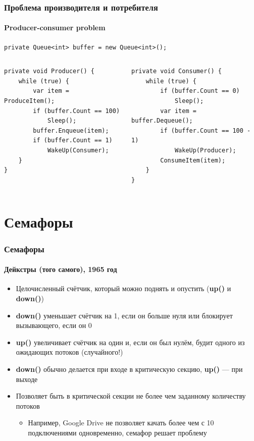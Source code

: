 \documentclass[xetex,mathserif,serif]{beamer}
\begin{document}
	\begin{frame}[fragile]
		\frametitle{Проблема производителя и потребителя}
		\framesubtitle{Producer-consumer problem}
		\begin{footnotesize}
			\begin{verbatim}
private Queue<int> buffer = new Queue<int>();
			\end{verbatim}
			\begin{columns}
				\begin{column}{0.5\textwidth}
					\begin{verbatim}
private void Producer() {
    while (true) {
        var item = ProduceItem();
        if (buffer.Count == 100)
            Sleep();
        buffer.Enqueue(item);
        if (buffer.Count == 1)
            WakeUp(Consumer);
    }
}
					\end{verbatim}
				\end{column}
				\begin{column}{0.5\textwidth}
					\begin{verbatim}
private void Consumer() {
    while (true) {
        if (buffer.Count == 0)
            Sleep();
        var item = buffer.Dequeue();
        if (buffer.Count == 100 - 1)
            WakeUp(Producer);
        ConsumeItem(item);
    }
}
					\end{verbatim}
				\end{column}
			\end{columns}
		\end{footnotesize}
	\end{frame}

	\section{Семафоры}

	\begin{frame}[fragile]
		\frametitle{Семафоры}
		\framesubtitle{Дейкстры (того самого), 1965 год}
		\begin{itemize}
			\item Целочисленный счётчик, который можно поднять и опустить (\textbf{up()} и \textbf{down()})
			\item \textbf{down()} уменьшает счётчик на 1, если он больше нуля или блокирует вызывающего, если он 0
			\item \textbf{up()} увеличивает счётчик на один и, если он был нулём, будит одного из ожидающих потоков (случайного!)
			\item \textbf{down()} обычно делается при входе в критическую секцию, \textbf{up()} --- при выходе
			\item Позволяет быть в критической секции не более чем заданному количеству потоков
			\begin{itemize}
				\item Например, Google Drive не позволяет качать более чем с 10 подключениями одновременно, семафор решает проблему
			\end{itemize}
		\end{itemize}
	\end{frame}
\end{document}
